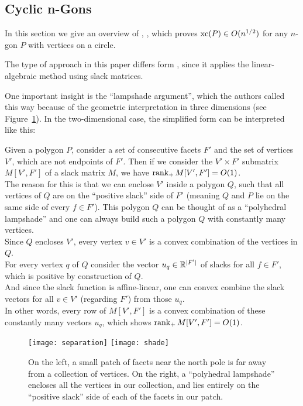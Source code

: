 \subsection{Cyclic n-Gons}

In this section we give an overview of , \textcite{kwan2020extension}, which proves $\operatorname{xc}(P) \in O(n^{1/2})$ for any $n$-gon $P$ with vertices on a circle.

The type of approach in this paper differs form \textcite{shitov2020sublinear}, since it applies the linear-algebraic method using slack matrices.

One important insight is the ``lampshade argument'', which the authors called this way because of the geometric interpretation in three dimensions (see Figure~\ref{fig:lampshade}). In the two-dimensional case, the simplified form can be interpreted like this:

Given a polygon $P$, consider a set of consecutive facets $F'$ and the set of vertices $V'$, which are not endpoints of $F'$. Then if we consider the $V' \times F'$ submatrix $M[V',F']$ of a slack matrix $M$, we have $\operatorname{rank}_+ M[V',F'] = O(1)$.\\
The reason for this is that we can enclose $V'$ inside a polygon $Q$, such that all vertices of $Q$ are on the ``positive slack'' side of $F'$ (meaning $Q$ and $P$ lie on the same side of every $f \in F'$). This polygon $Q$ can be thought of as a ``polyhedral lampshade'' and one can always build such a polygon $Q$ with constantly many vertices.\\
Since $Q$ encloses $V'$, every vertex $v \in V'$ is a convex combination of the vertices in $Q$.\\
For every vertex $q$ of $Q$ consider the vector $u_q \in \mathbb{R}^{\lvert F'\rvert}$ of slacks for all $f \in F'$, which is positive by construction of $Q$.\\
And since the slack function is affine-linear, one can convex combine the slack vectors for all $v \in V'$ (regarding $F'$) from those $u_q$.\\
In other words, every row of $M[V',F']$ is a convex combination of these constantly many vectors $u_q$, which shows $\operatorname{rank}_+ M[V',F'] = O(1)$.

\begin{figure}[h]
  \centering
  \texttt{[image: separation]}
  \texttt{[image: shade]}
  \caption{On the left, a small patch of facets near the north pole is far away from a collection of vertices. On the right, a ``polyhedral lampshade'' encloses all the vertices in our collection, and lies entirely on the ``positive slack'' side of each of the facets in our patch. \cite[Figure 2]{kwan2020extension}}
  \label{fig:lampshade}
\end{figure}

